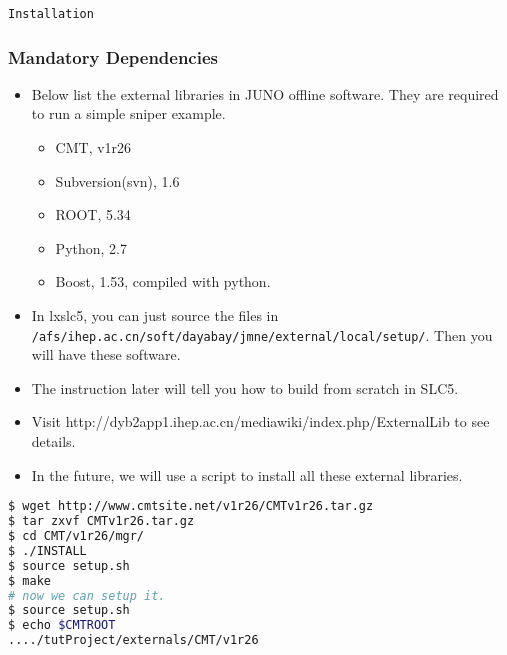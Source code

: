 \begin{frame}
    \begin{center}
        \LARGE \tt{Installation}
    \end{center}
\end{frame}

\begin{frame}
    \frametitle{Mandatory Dependencies}
\begin{itemize}
    \item Below list the external libraries in JUNO offline software.
    They are required to run a simple sniper example.
    \begin{itemize}
        \item CMT, v1r26
        \item Subversion(svn), 1.6
        \item ROOT, 5.34
        \item Python, 2.7
        \item Boost, 1.53, compiled with python.
    \end{itemize}
    \item In lxslc5, you can just source the files in
    {\tt /afs/ihep.ac.cn/soft/dayabay/jmne/external/local/setup/}.
    Then you will have these software.
    \item The instruction later will tell you how to build from scratch
    in SLC5.
    \item Visit http://dyb2app1.ihep.ac.cn/mediawiki/index.php/ExternalLib
    to see details.
    \item In the future, we will use a script to install all these external
    libraries.
\end{itemize}
\end{frame}

\newsavebox{\installcmt}
\begin{lrbox}{\installcmt}
\begin{lstlisting}[language=bash]
$ wget http://www.cmtsite.net/v1r26/CMTv1r26.tar.gz
$ tar zxvf CMTv1r26.tar.gz 
$ cd CMT/v1r26/mgr/
$ ./INSTALL 
$ source setup.sh 
$ make
# now we can setup it. 
$ source setup.sh 
$ echo $CMTROOT 
..../tutProject/externals/CMT/v1r26
\end{lstlisting}
\end{lrbox}

